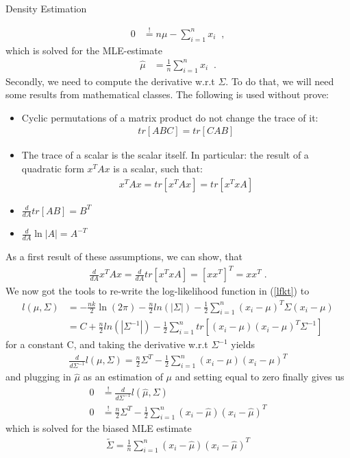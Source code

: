 \documentclass[
ngerman,
]{tudaexercise}
\newcommand{\sni}{\sum_{i=1}^{n}}
\begin{document}
\begin{task}{Density Estimation}
\begin{subtask}
			\begin{align*}
				0&\stackrel{!}{=}n\mu-\sni x_i\;\;,
			\end{align*}
			which is solved for the MLE-estimate
			\begin{align}
				\hat{\mu}&=\frac{1}{n}\sni x_i\;\;.
			\end{align}
			Secondly, we need to compute the derivative w.r.t $\Sigma$. To do that, we will need some results from mathematical classes. The following is used without prove:
			\begin{itemize}
				\item Cyclic permutations of a matrix product do not change the trace of it:\begin{align*}
					tr\left[ ABC\right] = tr\left[ CAB\right] 
				\end{align*}
				\item The trace of a scalar is the scalar itself. In particular: the result of a quadratic form $x^T Ax$ is a scalar, such that:\begin{align*}
					x^T Ax=tr\left[ x^TAx\right] =tr\left[ x^TxA\right] 
				\end{align*}
				\item $\frac{d}{dA}tr\left[ AB\right] =B^T$
				\item $\frac{d}{dA}\ln|A|=A^{-T}$
			\end{itemize}
		As a first result of these assumptions, we can show, that\begin{align*}
			\frac{d}{dA}x^T Ax=\frac{d}{dA}tr\left[ x^T xA\right] =\left[ xx^T\right] ^T=xx^T\;.
		\end{align*} 
		We now got the tools to re-write the log-likelihood function in (\ref{lfkt}) to
		\begin{align*}
			l(\mu,\Sigma)&=-\frac{nk}{2}\ln(2\pi)-\frac{n}{2}ln(|\Sigma|)-\frac{1}{2}\sni (x_i-\mu)^T\Sigma(x_i-\mu)\\&=C+\frac{n}{2}ln(|\Sigma^{-1}|)-\frac{1}{2}\sni tr\left[ (x_i-\mu)(x_i-\mu)^T \Sigma^{-1}\right] 
		\end{align*}
		for a constant C, and taking the derivative w.r.t $\Sigma^{-1}$ yields
		\begin{align*}
			\frac{d}{d\Sigma^{-1}}l(\mu,\Sigma)=\frac{n}{2}\Sigma^T-\frac{1}{2}\sni(x_i-\mu)(x_i-\mu)^T
		\end{align*}
		and plugging in $\hat{\mu}$ as an estimation of $\mu$ and setting equal to zero finally gives us
		\begin{align*}
			0&\stackrel{!}{=}\frac{d}{d\Sigma^{-1}}l(\hat{\mu},\Sigma)\\
			0&\stackrel{!}{=}\frac{n}{2}\Sigma^T-\frac{1}{2}\sni(x_i-\hat{\mu})(x_i-\hat{\mu})^T
		\end{align*}
		which is solved for the biased MLE estimate
		\begin{align}
			\tilde{\Sigma}=\frac{1}{n}\sni (x_i-\hat{\mu})(x_i-\hat{\mu})^T
		\end{align}
		\end{subtask}
	\end{task}
	
\end{document}
